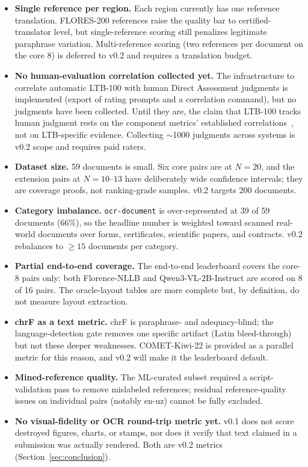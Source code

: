 \documentclass[11pt]{article}
\begin{document}
\begin{itemize}
  \item \textbf{Single reference per region.} Each region currently has one
  reference translation. FLORES-200 references raise the quality bar to
  certified-translator level, but single-reference scoring still penalizes
  legitimate paraphrase variation. Multi-reference scoring (two references per
  document on the core 8) is deferred to v0.2 and requires a translation budget.
  \item \textbf{No human-evaluation correlation collected yet.} The
  infrastructure to correlate automatic LTB-100 with human Direct Assessment
  judgments is implemented (export of rating prompts and a correlation
  command), but no judgments have been collected. Until they are, the claim that
  LTB-100 tracks human judgment rests on the component metrics' established
  correlations~\citep{popovic2015chrf,rei2022cometkiwi}, not on LTB-specific
  evidence. Collecting $\sim$1000 judgments across systems is v0.2 scope and
  requires paid raters.
  \item \textbf{Dataset size.} 59 documents is small. Six core pairs are at
  $N=20$, and the extension pairs at $N=10$--$13$ have deliberately wide
  confidence intervals; they are coverage proofs, not ranking-grade samples.
  v0.2 targets 200 documents.
  \item \textbf{Category imbalance.} \texttt{ocr-document} is over-represented
  at 39 of 59 documents (66\%), so the headline number is weighted toward
  scanned real-world documents over forms, certificates, scientific papers, and
  contracts. v0.2 rebalances to $\geq 15$ documents per category.
  \item \textbf{Partial end-to-end coverage.} The end-to-end leaderboard covers
  the core-8 pairs only: both Florence-NLLB and Qwen3-VL-2B-Instruct are scored
  on 8 of 16 pairs. The oracle-layout tables are more complete but, by
  definition, do not measure layout extraction.
  \item \textbf{chrF as a text metric.} chrF is paraphrase- and adequacy-blind;
  the language-detection gate removes one specific artifact (Latin
  bleed-through) but not these deeper weaknesses. COMET-Kiwi-22 is provided as a
  parallel metric for this reason, and v0.2 will make it the leaderboard
  default.
  \item \textbf{Mined-reference quality.} The ML-curated subset required a
  script-validation pass to remove mislabeled references; residual
  reference-quality issues on individual pairs (notably en-uz) cannot be fully
  excluded.
  \item \textbf{No visual-fidelity or OCR round-trip metric yet.} v0.1 does not
  score destroyed figures, charts, or stamps, nor does it verify that text
  claimed in a submission was actually rendered. Both are v0.2 metrics
  (Section~\ref{sec:conclusion}).
\end{itemize}
\end{document}
